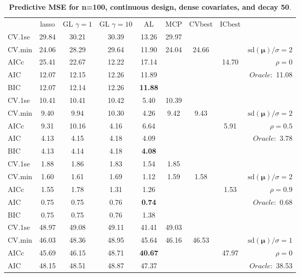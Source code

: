 \begin{table}\vspace{-.5cm}
\caption[l]{ { \bf Predictive MSE for n=100, continuous design, 
dense covariates, and  decay  50}.}
\vspace{-.5cm}
\footnotesize{}
\begin{center}
\begin{tabular}{l*{7}{c}|r}
 & lasso & GL $\gamma=1$ & GL $\gamma=10$ & AL & MCP  & CVbest & ICbest  \\
\cline{1-9}
CV.1se & 29.84 & 30.21 & 30.39 & 13.26 & 29.97 & & & \\
CV.min & 24.06 & 28.29 & 29.64 & 11.90 & 24.04 & 24.66 & & $\mathrm{sd}(\mathbf{\mu})/\sigma=2$ \\
AICc & 25.41 & 22.67 & 12.22 & 17.14 & & & 14.70 &  $\rho=0$ \\
AIC & 12.07 & 12.15 & 12.26 & 11.89 & & & &  \multirow{2}{*}{$Oracle: $ 11.08} \\
BIC & 12.07 & 12.14 & 12.26 & {\bf 11.88} & & & &  \\
 \hline 
CV.1se & 10.41 & 10.41 & 10.42 & 5.40 & 10.39 & & & \\
CV.min & 9.40 & 9.94 & 10.30 & 4.26 & 9.42 & 9.43 & & $\mathrm{sd}(\mathbf{\mu})/\sigma=2$ \\
AICc & 9.31 & 10.16 & 4.16 & 6.64 & & & 5.91 &  $\rho=0.5$ \\
AIC & 4.13 & 4.15 & 4.18 & 4.09 & & & &  \multirow{2}{*}{$Oracle: $ 3.78} \\
BIC & 4.13 & 4.14 & 4.18 & {\bf 4.08} & & & &  \\
 \hline 
CV.1se & 1.88 & 1.86 & 1.83 & 1.54 & 1.85 & & & \\
CV.min & 1.60 & 1.61 & 1.69 & 1.12 & 1.59 & 1.58 & & $\mathrm{sd}(\mathbf{\mu})/\sigma=2$ \\
AICc & 1.55 & 1.78 & 1.31 & 1.26 & & & 1.53 &  $\rho=0.9$ \\
AIC & 0.75 & 0.75 & 0.76 & {\bf 0.74} & & & &  \multirow{2}{*}{$Oracle: $ 0.68} \\
BIC & 0.75 & 0.75 & 0.76 & 1.38 & & & &  \\
 \hline 
CV.1se & 48.97 & 49.08 & 49.11 & 41.41 & 49.03 & & & \\
CV.min & 46.03 & 48.36 & 48.95 & 45.64 & 46.16 & 46.53 & & $\mathrm{sd}(\mathbf{\mu})/\sigma=1$ \\
AICc & 45.69 & 46.15 & 48.71 & {\bf 40.67} & & & 47.97 &  $\rho=0$ \\
AIC & 48.15 & 48.51 & 48.87 & 47.37 & & & &  \multirow{2}{*}{$Oracle: $ 38.53} \\

\end{tabular}
\end{center}
\end{table}
